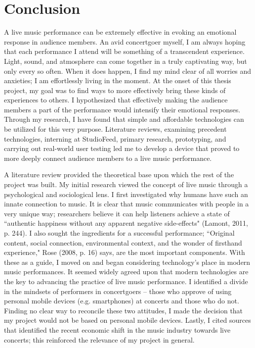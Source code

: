 \chapter{Conclusion}

A live music performance can be extremely effective in evoking an emotional response in audience members. An avid concertgoer myself, I am always hoping that each performance I attend will be something of a transcendent experience. Light, sound, and atmosphere can come together in a truly captivating way, but only every so often. When it does happen, I find my mind clear of all worries and anxieties; I am effortlessly living in the moment. At the onset of this thesis project, my goal was to find ways to more effectively bring these kinds of experiences to others. I hypothesized that effectively making the audience members a part of the performance would intensify their emotional responses. Through my research, I have found that simple and affordable technologies can be utilized for this very purpose. Literature reviews, examining precedent technologies, interning at StudioFeed, primary research, prototyping, and carrying out real-world user testing led me to develop a device that proved to more deeply connect audience members to a live music performance.

A literature review provided the theoretical base upon which the rest of the project was built. My initial research viewed the concept of live music through a psychological and sociological lens. I first investigated why humans have such an innate connection to music. It is clear that music communicates with people in a very unique way; researchers believe it can help listeners achieve a state of ``authentic happiness without any apparent negative side-effects" (Lamont, 2011, p. 244). I also sought the ingredients for a successful performance; ``Original content, social connection, environmental context, and the wonder of firsthand experience," Rose (2008, p. 16) says, are the most important components. With these as a guide, I moved on and began considering technology's place in modern music performances. It seemed widely agreed upon that modern technologies are the key to advancing the practice of live music performance. I identified a divide in the mindsets of performers in concertgoers -- those who approve of using personal mobile devices (e.g. smartphones) at concerts and those who do not. Finding no clear way to reconcile these two attitudes, I made the decision that my project would not be based on personal mobile devices. Lastly, I cited sources that identified the recent economic shift in the music industry towards live concerts; this reinforced the relevance of my project in general.

